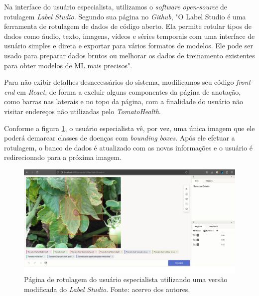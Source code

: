 Na interface do usuário especialista, utilizamos o \textit{software open-source} de rotulagem \emph{Label Studio}. Segundo sua página no \emph{Github}, "O Label Studio é uma ferramenta de rotulagem de dados de código aberto. Ela permite rotular tipos de dados como áudio, texto, imagens, vídeos e séries temporais com uma interface de usuário simples e direta e exportar para vários formatos de modelos. Ele pode ser usado para preparar dados brutos ou melhorar os dados de treinamento existentes para obter modelos de ML mais precisos".

Para não exibir detalhes desnecessários do sistema, modificamos seu código \textit{front-end} em \emph{React}, de forma a excluir alguns componentes da página de anotação, como barras nas laterais e no topo da página, com a finalidade do usuário não visitar endereços não utilizadas pelo \emph{TomatoHealth}.

Conforme a figura \ref{fig:rotulagem_labelstudio}, o usuário especialista vê, por vez, uma única imagem que ele poderá demarcar classes de doenças com \textit{bounding boxes}. Após ele efetuar a rotulagem, o banco de dados é atualizado com as novas informações e o usuário é redirecionado para a próxima imagem.

\begin{figure}[htbp]
    \centering
    \includegraphics[width=1\linewidth]{images/rotulagem_labelstudio.jpg}
    \caption{\label{fig:rotulagem_labelstudio} Página de rotulagem do usuário especialista utilizando uma versão modificada do \emph{Label Studio}. Fonte: acervo dos autores.}
\end{figure}